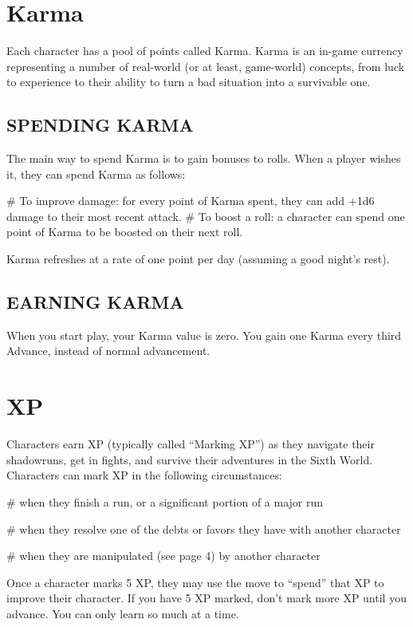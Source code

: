 \section{Karma}

Each character has a pool of points called Karma. Karma is an in-game currency representing a number of real-world (or at least, game-world) concepts, from luck to experience to their ability to turn a bad situation into a survivable one.

\subsection{SPENDING KARMA}
The main way to spend Karma is to gain bonuses to rolls. When a player wishes it, they can spend Karma as follows:

\begin{easylist}
# To improve damage: for every point of Karma spent, they can add +1d6 damage to their most recent attack.
# To boost a roll: a character can spend one point of Karma to be boosted on their next roll.    
\end{easylist}

Karma refreshes at a rate of one point per day (assuming a good night’s rest).

\subsection{EARNING KARMA}
When you start play, your Karma value is zero. You gain one Karma every third Advance, instead of normal advancement.


\section{XP}

Characters earn XP (typically called “Marking XP”) as they navigate their shadowruns, get in fights, and survive their adventures in the Sixth World. Characters can mark XP in the following circumstances:

\begin{easylist}
# when they finish a run, or a significant portion of a major run

# when they resolve one of the debts or favors they have with another character

# when they are manipulated (see page 4) by another character
\end{easylist}

Once a character marks 5 XP, they may use the  move to ``spend'' that XP to improve their character. If you have 5 XP marked, don’t mark more XP until you advance. You can only learn so much at a time.


